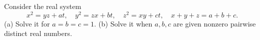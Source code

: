 Consider the real system
\[
x^2=yz+at,\quad y^2=zx+bt,\quad z^2=xy+ct,\quad x+y+z=a+b+c.
\]
(a) Solve it for $a=b=c=1$.
(b) Solve it when $a,b,c$ are given nonzero pairwise distinct real numbers.
